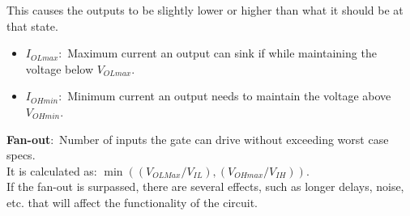 \documentclass[nobib]{tufte-handout}
\newcommand{\defn}[2]{\noindent\textbf{#1}:\ #2}
\begin{document}
    This causes the outputs to be slightly lower or higher than what it should be at that state.\\
    \begin{itemize}
        \item \defn{$I_{OLmax}$}{Maximum current an output can sink if while maintaining the voltage below $V_{OLmax}$.}
        \item \defn{$I_{OHmin}$}{Minimum current an output needs to maintain the voltage above $V_{OHmin}$.}
    \end{itemize}
    \defn{Fan-out}{Number of inputs the gate can drive without exceeding worst case specs.}\\
    It is calculated as: $\min((V_{OLMax}/V_{IL}), (V_{OHmax}/V_{IH}))$.\\
    If the fan-out is surpassed, there are several effects, such as longer delays, noise, etc. that will affect the functionality of the circuit.
\end{document}
